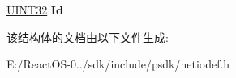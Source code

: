\begin{DoxyCompactItemize}
\begin{tabbing}
\end{tabbing}\item 
\mbox{\label{struct___i_p_v6___f_r_a_g_m_e_n_t___h_e_a_d_e_r_af2fcd50645fdbf72b5fb4c4b9a3a5873}} 
\hyperlink{_processor_bind_8h_ae1e6edbbc26d6fbc71a90190d0266018}{U\+I\+N\+T32} {\bfseries Id}
\end{DoxyCompactItemize}


该结构体的文档由以下文件生成\+:\begin{DoxyCompactItemize}
\item 
E\+:/\+React\+O\+S-\/0../sdk/include/psdk/netiodef.\+h\end{DoxyCompactItemize}
